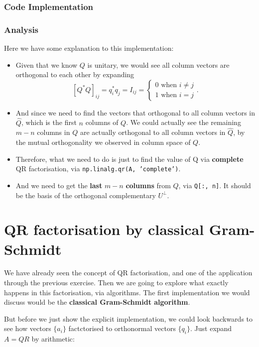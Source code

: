 \newpage
\subsubsection*{Code Implementation}%
\label{ssub:code_implementation}


\subsubsection*{Analysis}%
\label{ssub:analysis}
Here we have some explanation to this implementation:
\begin{itemize}
\item Given that we know $Q$ is unitary, we would see all column vectors are orthogonal to each other by expanding
  \[
    [Q^*Q]_{ij} = q_i^*q_j = I_{ij} = \left\{
      \begin{array}{l}
      0 \text{ when $i \neq j$} \\
      1 \text{ when $i = j$}
      \end{array}
    \right.
  .\] 
  \item And since we need to find the vectors that orthogonal to all column vectors in $\hat{Q}$, which is the first $n$ columns of $Q$. We could actually see the remaining $m - n$ columns in  $Q$ are actually orthogonal to all column vectors in $\hat{Q}$, by the mutual orthogonality we observed in column space of $Q$. 
  \item Therefore, what we need to do is just to find the value of Q via \textbf{complete} QR factorisation, via \texttt{np.linalg.qr(A, 'complete')}.
  \item And we need to get the \textbf{last} $m - n$ \textbf{columns} from $Q$, via \texttt{Q[:, n]}. It should be the basis of the orthogonal complementary $U^{\bot}$.
\end{itemize}

\newpage
\section{QR factorisation by classical Gram-Schmidt}%
We have already seen the concept of QR factorisation, and one of the application through the previous exercise. Then we are going to explore what exactly happens in this factorisation, via algorithms. The first implementation we would discuss would be the \textbf{classical Gram-Schmidt algorithm}. 

\medskip
\noindent But before we just show the explicit implementation, we could look backwards to see how vectors $ \{a_i\} $ factctorised to orthonormal vectors $ \{q_i\} $. Just expand $A = QR$ by arithmetic:

